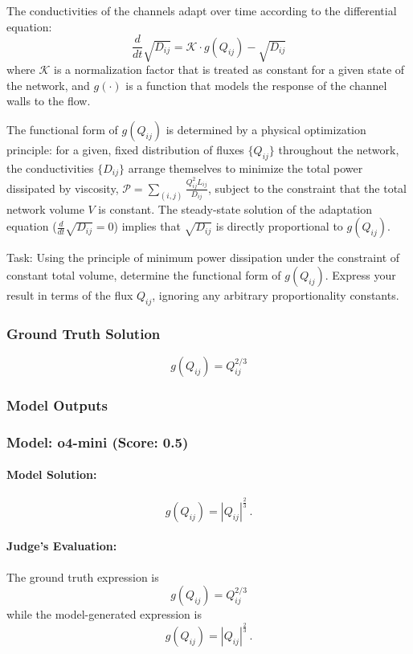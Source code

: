 \documentclass[10pt]{article}
\begin{document}
The conductivities of the channels adapt over time according to the differential equation:
$$ \frac{d}{dt}\sqrt{D_{ij}} = \mathcal{K} \cdot g(Q_{ij}) - \sqrt{D_{ij}} $$
where $\mathcal{K}$ is a normalization factor that is treated as constant for a given state of the network, and $g(\cdot)$ is a function that models the response of the channel walls to the flow.

The functional form of $g(Q_{ij})$ is determined by a physical optimization principle: for a given, fixed distribution of fluxes $\{Q_{ij}\}$ throughout the network, the conductivities $\{D_{ij}\}$ arrange themselves to minimize the total power dissipated by viscosity, $\mathcal{P} = \sum_{(i,j)} \frac{Q_{ij}^2 L_{ij}}{D_{ij}}$, subject to the constraint that the total network volume $V$ is constant. The steady-state solution of the adaptation equation ($\frac{d}{dt}\sqrt{D_{ij}} = 0$) implies that $\sqrt{D_{ij}}$ is directly proportional to $g(Q_{ij})$.

Task:
Using the principle of minimum power dissipation under the constraint of constant total volume, determine the functional form of $g(Q_{ij})$. Express your result in terms of the flux $Q_{ij}$, ignoring any arbitrary proportionality constants.

\subsubsection*{Ground Truth Solution}
\[ \boxed{g(Q_{ij}) = Q_{ij}^{2/3}} \]

\subsubsection*{Model Outputs}
\subsubsection*{Model: o4-mini (Score: 0.5)}
\paragraph*{Model Solution:}
\[ g(Q_{ij}) = |Q_{ij}|^{\tfrac23}\,. \]

\paragraph*{Judge's Evaluation:}

The ground truth expression is 
\[
g(Q_{ij}) = Q_{ij}^{2/3}
\]
while the model-generated expression is 
\[
g(Q_{ij}) = |Q_{ij}|^{\tfrac{2}{3}}\,.
\]
\end{document}
